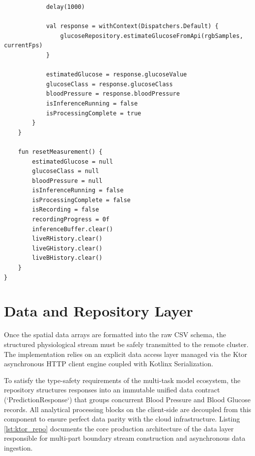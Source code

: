 \begin{verbatim}
            delay(1000)

            val response = withContext(Dispatchers.Default) {
                glucoseRepository.estimateGlucoseFromApi(rgbSamples, currentFps)
            }
            
            estimatedGlucose = response.glucoseValue
            glucoseClass = response.glucoseClass
            bloodPressure = response.bloodPressure
            isInferenceRunning = false
            isProcessingComplete = true
        }
    }

    fun resetMeasurement() {
        estimatedGlucose = null
        glucoseClass = null
        bloodPressure = null
        isInferenceRunning = false
        isProcessingComplete = false
        isRecording = false
        recordingProgress = 0f
        inferenceBuffer.clear()
        liveRHistory.clear()
        liveGHistory.clear()
        liveBHistory.clear()
    }
}
\end{verbatim}
\vspace{1.5em}

\section{Data and Repository Layer}
Once the spatial data arrays are formatted into the raw CSV schema, the structured physiological stream must be safely transmitted to the remote cluster. The implementation relies on an explicit data access layer managed via the Ktor asynchronous HTTP client engine coupled with Kotlinx Serialization. 

To satisfy the type-safety requirements of the multi-task model ecosystem, the repository structures responses into an immutable unified data contract (`PredictionResponse`) that groups concurrent Blood Pressure and Blood Glucose records. All analytical processing blocks on the client-side are decoupled from this component to ensure perfect data parity with the cloud infrastructure. Listing \ref{lst:ktor_repo} documents the core production architecture of the data layer responsible for multi-part boundary stream construction and asynchronous data ingestion.

